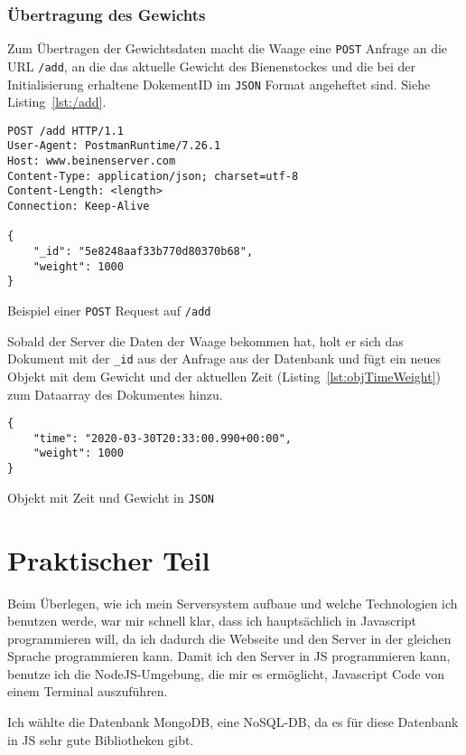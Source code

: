 \documentclass[a4paper, ngerman, 11pt]{scrartcl}
\begin{document}
\subsubsection{Übertragung des Gewichts}
Zum Übertragen der Gewichtsdaten macht die Waage eine \texttt{POST} Anfrage an die URL \texttt{/add}, an die das aktuelle Gewicht des Bienenstockes und die bei der Initialisierung erhaltene DokementID im \texttt{JSON} Format angeheftet sind. Siehe Listing~\ref{lst:/add}.
\begin{listing}[ht]
\centering
\begin{verbatim}
POST /add HTTP/1.1
User-Agent: PostmanRuntime/7.26.1
Host: www.beinenserver.com
Content-Type: application/json; charset=utf-8
Content-Length: <length>
Connection: Keep-Alive

{
    "_id": "5e8248aaf33b770d80370b68",
    "weight": 1000
}
\end{verbatim}
\caption{Beispiel einer \texttt{POST} Request auf \texttt{/add}}\label{lst:/add}
\end{listing}

Sobald der Server die Daten der Waage bekommen hat, holt er sich das Dokument mit der \texttt{\_id} aus der Anfrage aus der Datenbank und fügt ein neues Objekt mit dem Gewicht und der aktuellen Zeit (Listing~\ref{lst:objTimeWeight}) zum Dataarray des Dokumentes hinzu.
\begin{listing}[ht]
\centering
\begin{verbatim}
{
    "time": "2020-03-30T20:33:00.990+00:00",
    "weight": 1000
}
\end{verbatim}
\caption{Objekt mit Zeit und Gewicht in \texttt{JSON}\label{lst:objTimeWeight}}
\end{listing}

\section{Praktischer Teil}

Beim Überlegen, wie ich mein Serversystem aufbaue und welche Technologien ich benutzen werde, war mir schnell klar, dass ich hauptsächlich in Javascript programmieren will, da ich dadurch die Webseite und den Server in der gleichen Sprache programmieren kann.
Damit ich den Server in JS programmieren kann, benutze ich die NodeJS-Umgebung, die mir es ermöglicht, Javascript Code von einem Terminal auszuführen.

Ich wählte die Datenbank MongoDB, eine NoSQL-DB, da es für diese Datenbank in JS sehr gute Bibliotheken gibt.
\end{document}
